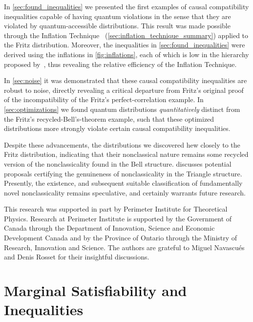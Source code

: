 \documentclass[aps, 10pt, english, twoside, pra, nofootinbib, tightenlines, longbibliography, superscriptaddress]{revtex4-1}
\begin{document}
    In \cref{sec:found_inequalities} we presented the first examples of causal compatibility inequalities capable of having quantum violations in the sense that they are violated by quantum-accessible distributions. This result was made possible through the Inflation Technique~\cite{Inflation} (\cref{sec:inflation_technique_summary}) applied to the Fritz distribution. Moreover, the inequalities in \cref{sec:found_inequalities} were derived using the inflations in \cref{fig:inflations}, each of which is low in the hierarchy proposed by~\cite{Navascues_2017}, thus revealing the relative efficiency of the Inflation Technique.

    In \cref{sec:noise} it was demonstrated that these causal compatibility inequalities are robust to noise, directly revealing a critical departure from Fritz's original proof of the incompatibility of the Fritz's perfect-correlation example. In \cref{sec:optimizations} we found quantum distributions \textit{quantitatively} distinct from the Fritz's recycled-Bell's-theorem example, such that these optimized distributions more strongly violate certain causal compatibility inequalities.

    Despite these advancements, the distributions we discovered hew closely to the Fritz distribution, indicating that their nonclassical nature remains some recycled version of the nonclassicality found in the Bell structure.  discusses potential proposals certifying the genuineness of nonclassicality in the Triangle structure. Presently, the existence, and subsequent suitable classification of fundamentally novel nonclassicality remains speculative, and certainly warrants future research.

    \begin{acknowledgments}
    This research was supported in part by Perimeter Institute for Theoretical Physics. Research at Perimeter Institute is supported by the Government of Canada through the Department of Innovation, Science and Economic Development Canada and by the Province of Ontario through the Ministry of Research, Innovation and Science. The authors are grateful to Miguel Navascués and Denis Rosset for their insightful discussions.
    \end{acknowledgments}

    \appendix

    \section{Marginal Satisfiability and Inequalities}
    \label{sec:marginal_satisfiability}
\end{document}
